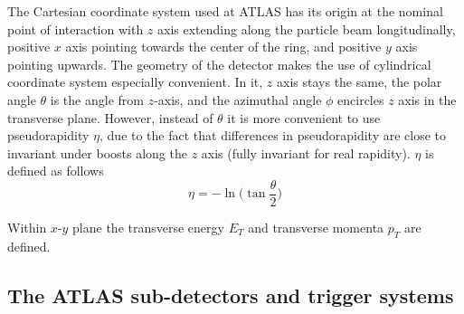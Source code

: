 The Cartesian coordinate system used at ATLAS has its origin at the nominal point of interaction with $z$ axis extending along the particle beam longitudinally, positive $x$ axis pointing towards the center of the ring, and positive $y$ axis pointing upwards. 
The geometry of the detector makes the use of cylindrical coordinate system especially convenient. In it, $z$ axis stays the same, the polar angle $\theta$ is the angle from $z$-axis, and the azimuthal angle $\phi$ encircles $z$ axis in the transverse plane. However, instead of $\theta$ it is more convenient to use pseudorapidity $\eta$, due to the fact that differences in pseudorapidity are close to invariant under boosts along the $z$ axis (fully invariant for real rapidity). $\eta$ is defined as follows
\begin{equation}
\eta = -\ln\biggl(\tan\frac{\theta}{2}\biggr)
\end{equation}

Within $x$-$y$ plane the transverse energy $E_{T}$ and transverse momenta $p_{T}$ are defined.

\subsection{ The ATLAS sub-detectors and trigger systems}

